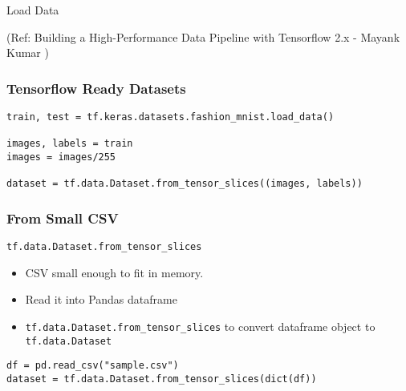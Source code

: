 \begin{frame}
  \begin{center}
    {\Large Load Data}
	
	{\tiny (Ref: Building a High-Performance Data Pipeline with Tensorflow 2.x - Mayank Kumar )}
  \end{center}
\end{frame}

\begin{frame}[fragile]\frametitle{Tensorflow Ready Datasets}
\begin{lstlisting}
train, test = tf.keras.datasets.fashion_mnist.load_data()

images, labels = train
images = images/255

dataset = tf.data.Dataset.from_tensor_slices((images, labels))
\end{lstlisting}
\end{frame}

\begin{frame}[fragile]\frametitle{From Small CSV}
\lstinline|tf.data.Dataset.from_tensor_slices|

\begin{itemize}
\item CSV small enough to fit in memory.
\item Read it into Pandas dataframe
\item \lstinline|tf.data.Dataset.from_tensor_slices| to convert dataframe object to \lstinline|tf.data.Dataset|
\end{itemize}

\begin{lstlisting}
df = pd.read_csv("sample.csv")
dataset = tf.data.Dataset.from_tensor_slices(dict(df))
\end{lstlisting}
\end{frame}





